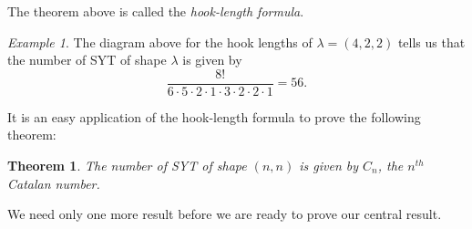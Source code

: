 \documentclass[11pt,letterpaper,twoside,english]{article}
\theoremstyle{theorem}
\newtheorem{theorem}{Theorem}
\theoremstyle{remark}
\newtheorem{example}{Example}
\begin{document}
The theorem above is called the \emph{hook-length formula}.

\begin{example}
The diagram above for the hook lengths of $\lambda=(4, 2, 2)$ tells us that the number of SYT of shape $\lambda$ is given by
\[\frac{8!}{6\cdot 5\cdot 2 \cdot 1 \cdot 3 \cdot 2 \cdot 2\cdot 1}=56.\]
\end{example}

It is an easy application of the hook-length formula to prove the following theorem:

\begin{theorem}
The number of SYT of shape $(n, n)$ is given by $C_n$, the $n^{th}$ Catalan number.
\end{theorem}

We need only one more result before we are ready to prove our central result.
\end{document}
